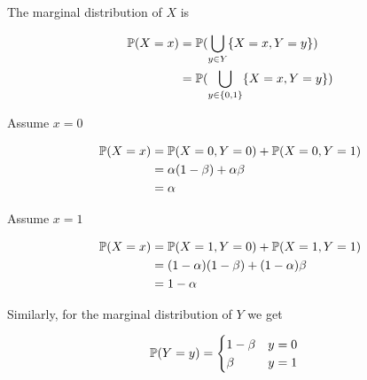 
The marginal distribution of $ X$ is

\begin{align*}
    \P(X = x) &= \P( \bigcup_{y \in Y} \{ X = x, Y = y \} )\\
	      &= \P( \bigcup_{y \in \{ 0,1 \} } \{ X = x, Y = y \})
\end{align*}

Assume $ x=0$

\begin{align*}
    \P(X=x) &= \P(X = 0, Y= 0) + \P(X=0, Y=1)\\
	    &= \alpha(1-\beta) + \alpha \beta\\
	    &= \alpha
\end{align*}

Assume $ x =1$

\begin{align*}
    \P(X=x) &= \P(X= 1, Y= 0) + \P(X=1, Y=1)\\
	    &= (1-\alpha)(1-\beta) + (1-\alpha)\beta\\
	    &= 1-\alpha
\end{align*}

Similarly, for the marginal distribution of $ Y$ we 
get

\begin{align*}
    \P(Y=y) &= 
    \begin{cases}
	1 -\beta & y = 0\\
	\beta & y = 1
    \end{cases}
\end{align*}

